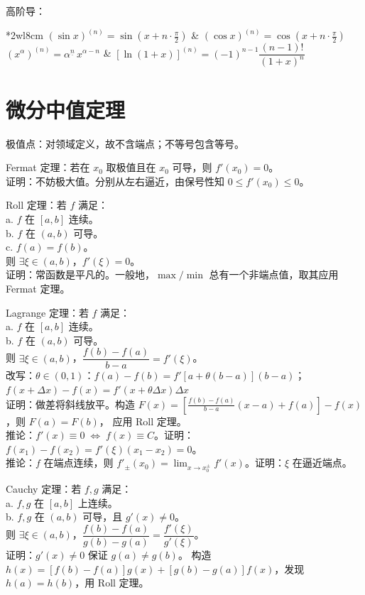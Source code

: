 \documentclass[12pt, a4paper, UTF8, openany]{ctexbook}
\begin{document}
        高阶导：
        \begin{longtable}[h]{*{2}{w{l}{8cm}}}
            $(\sin x)^{(n)} = \sin(x + n \cdot \frac{\pi}{2})$ & $(\cos x)^{(n)} = \cos(x + n \cdot \frac{\pi}{2})$ \\
            $(x^\alpha)^{(n)} = \alpha^{\underline{n}}\,x^{\alpha - n}$ & 
            $[\ln(1 + x)]^{(n)} = (-1)^{n - 1}\dfrac{(n - 1)!}{(1 + x)^n}$
        \end{longtable}

    \section{微分中值定理}
    极值点：对领域定义，故不含端点；不等号{\heiti 包含等号}。

    Fermat 定理：若在 $x_0$ 取极值且在 $x_0$ 可导，则 $f'(x_0) = 0$。\\
    证明：不妨极大值。分别从左右逼近，由保号性知 $0 \leqslant f'(x_0) \leqslant 0$。

    Roll 定理：若 $f$ 满足：\\
    a. $f$ 在 $[a, b]$ 连续。\\
    b. $f$ 在 $(a, b)$ 可导。 \\
    c. $f(a) = f(b)$。 \\
    则 $\exists \xi \in (a, b)$，$f'(\xi) = 0$。\\
    证明：常函数是平凡的。一般地，$\max/\min$ 总有一个非端点值，取其应用 Fermat 定理。

    Lagrange 定理：若 $f$ 满足：\\
    a. $f$ 在 $[a, b]$ 连续。\\
    b. $f$ 在 $(a, b)$ 可导。\\
    则 $\exists \xi \in (a, b)$，$\dfrac{f(b) - f(a)}{b - a} = f'(\xi)$。\\
    改写：$\theta \in (0, 1)$：$f(a) - f(b) = f'\left[a + \theta(b - a)\right](b - a)$；
        $f(x + \Delta x) - f(x) = f'(x + \theta\Delta x)\Delta x$ \\
    证明：做差将斜线放平。构造 $F(x) = \left[\frac{f(b) - f(a)}{b - a}(x - a) + f(a)\right] - f(x)$，则 $F(a) = F(b)$，
    应用 Roll 定理。\\
    推论：$f'(x) \equiv 0 \; \iff \; f(x) \equiv C$。证明：$f(x_1) - f(x_2) = f'(\xi)(x_1 - x_2) = 0$。\\
    推论：$f$ 在端点连续，则 $f'_{\pm}(x_0) = \lim_{x \to x_0^{\pm}} f'(x)$。证明：$\xi$ 在逼近端点。

    Cauchy 定理：若 $f, g$ 满足：\\
    a. $f, g$ 在 $[a, b]$ 上连续。\\
    b. $f, g$ 在 $(a, b)$ 可导，且 $g'(x) \neq 0$。\\
    则 $\exists \xi \in (a, b)$，$\dfrac{f(b) - f(a)}{g(b) - g(a)} = \dfrac{f'(\xi)}{g'(\xi)}$。\\
    证明：$g'(x) \neq 0$ 保证 $g(a) \neq g(b)$。
    构造 $h(x) = \left[f(b) - f(a)\right]g(x) + \left[g(b) - g(a)\right]f(x)$，发现 $h(a) = h(b)$，用 Roll 定理。
\end{document}

